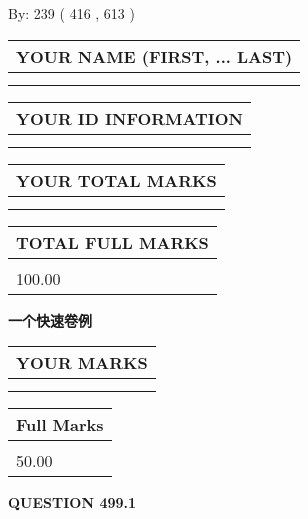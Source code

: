 \documentclass{ctexart}
\begin{document}
   
\hspace{1.0in} By: 
 239 ( 416 ,  613 )
   
   
   
   
\newpage 
\setcounter{page}{ 
   499001 } 
   
   
   
   
\noindent\begin{tabular}{|l|}
\hline
YOUR NAME (FIRST, ... LAST)  \\
\hline
 \\ 
 \\ 
\hline
\end{tabular}
\hspace{0.05in} \begin{tabular}{|l|}
\hline
 YOUR   ID   INFORMATION  \\
\hline
 \\ 
 \\ 
\hline
\end{tabular}
   
   
\vspace{0.2in}\noindent\begin{tabular}{|l|}
\hline
YOUR TOTAL MARKS  \\
\hline
 \\ 
 \\ 
\hline
\end{tabular}
\hspace{0.05in} \begin{tabular}{|l|}
\hline
TOTAL FULL MARKS  \\
\hline
 \\ 
100.00 \\
\hline
\end{tabular}
   
   
 \vspace{0.2in}
{\LARGE {\textbf{ 一个快速卷例}}}
   
   
  
\vspace{0.2in}
  
\noindent\begin{tabular}{|l|}
\hline
 YOUR MARKS  \\
\hline
 \\ 
 \\ 
\hline
\end{tabular}
\hspace{0.05in} \begin{tabular}{|l|}
\hline
 Full Marks  \\
\hline
 \\ 
50.00 \\
\hline
\end{tabular}
{\textbf{\Large{QUESTION
499.1 
}}}
  
\end{document}
